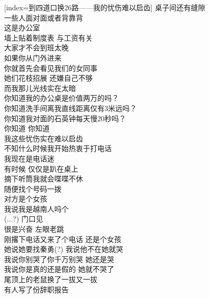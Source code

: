 \begin{songs}{}
  [index={到四道口换26路——我的忧伤难以启齿}]
	桌子间还有缝隙	\\
	一些人面对面或者背靠背	\\
	这是办公室	\\
	墙上贴着制度表 \hspace{5mm} 与工资有关	\\
	大家才不会到班太晚	\\
	如果你从门外进来	\\
	你就首先会看见我们的女同事	\\
	她们花枝招展 还嫌自己不够	\\
	而我那儿光线实在太暗	\\
	你知道我的办公桌是价值两万的吗？	\\
	你知道洗手间离我直线距离仅有3米远吗？	\\
	你知道我对面的石英钟每天慢20秒吗？	\\
	你知道 \hspace{5mm} 你知道	\\
	我这些忧伤实在难以启齿	\\
	\vspace{2ex}
	不知什么时候我开始热衷于打电话	\\
	我现在是电话迷	\\
	有时候 \hspace{5mm} 仅仅是趴在桌上	\\
	摘下听筒我就会喋喋不休	\\
	随便找个号码一拨	\\
	对方是个女孩	\\
	我说我是越南人吗个	\\
	(...?) 门口见	\\
	很是兴奋 \hspace{5mm} 左眼老跳	\\
	\vspace{2ex}
	刚撂下电话又来了个电话 \hspace{5mm} 还是个女孩 \\
	她说她要找秦勇(?) \hspace{5mm} 我说他不在她就哭 \\
	我说你别哭了你千万别哭 \hspace{5mm} 她还是哭	\\
	我说你是真的还是假的 \hspace{5mm} 她就不哭了	\\
	\vspace{2ex}
	尾顶上的老鼠换了一拔又一拔	\\
	有人写了份辞职报告	\\

\end{songs}
